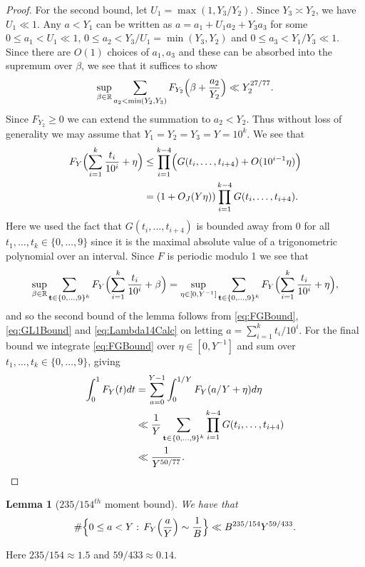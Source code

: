 \documentclass[10pt]{amsart}
\theoremstyle{plain}
\newtheorem{lmm}[thrm]{Lemma}
\numberwithin{sblmm}{thrm}
\numberwithin{equation}{section}
\begin{document}
\begin{proof}
For the second bound, let $U_1=\max(1,Y_3/Y_2)$. Since $Y_3\asymp Y_2$, we have $U_1\ll 1$. Any $a<Y_1$ can be written as $a=a_1+U_1a_2+Y_3 a_3$ for some $0\le a_1< U_1\ll 1$, $0\le a_2<Y_3/U_1=\min(Y_3,Y_2)$ and $0\le a_3< Y_1/Y_3\ll 1$. Since there are $O(1)$ choices of $a_1,a_3$ and these can be absorbed into the supremum over $\beta$, we see that it suffices to show
\[
\sup_{\beta\in\mathbb{R}}\sum_{a_2<\min(Y_2,Y_3)}F_{Y_2}\Bigl(\beta+\frac{a_2}{Y_2}\Bigr)\ll Y_2^{27/77}.
\]
Since $F_{Y_2}\ge 0$ we can extend the summation to $a_2<Y_2$. Thus without loss of generality we may assume that $Y_1=Y_2=Y_3=Y=10^k$. We see that
%
\begin{align}
F_Y\Bigl(\sum_{i=1}^{k}\frac{t_i}{10^i}+\eta\Bigr)
&\le\prod_{i=1}^{k-4}\Bigl( G(t_i,\dots,t_{i+4})+O(10^{i-1}\eta) \Bigr)\nonumber\\
&=(1+O_J(Y\eta))\prod_{i=1}^{k-4} G(t_i,\dots,t_{i+4}).\label{eq:FGBound}
\end{align}
%
Here we used the fact that $G(t_i,\dots,t_{i+4})$ is bounded away from 0  for all $t_1,\dots,t_{k}\in\{0,\dots,9\}$ since it is the maximal absolute value of a trigonometric polynomial over an interval. Since $F$ is periodic modulo 1 we see that
\[
\sup_{\beta\in\mathbb{R}}\sum_{\mathbf{t}\in\{0,\dots,9\}^k}F_Y\Bigl(\sum_{i=1}^{k}\frac{t_i}{10^i}+\beta\Bigr)=\sup_{\eta\in[0,Y^{-1}]}\sum_{\mathbf{t}\in\{0,\dots,9\}^k}F_Y\Bigl(\sum_{i=1}^{k}\frac{t_i}{10^i}+\eta\Bigr),
\]
and so the second bound of the lemma follows from \eqref{eq:FGBound}, \eqref{eq:GL1Bound} and \eqref{eq:Lambda14Calc} on letting $a=\sum_{i=1}^k t_i/10^i$. For the final bound we integrate \eqref{eq:FGBound} over $\eta\in[0,Y^{-1}]$ and sum over $t_1,\dots,t_k\in\{0,\dots,9\}$, giving
\begin{align*}
\int_0^1 F_Y(t)d t&=\sum_{a=0}^{Y-1}\int_0^{1/Y}F_Y(a/Y+\eta)d\eta\\
&\ll \frac{1}{Y}\sum_{\mathbf{t}\in\{0,\dots,9\}^k}\prod_{i=1}^{k-4} G(t_i,\dots,t_{i+4})\\
&\ll \frac{1}{Y^{50/77}}.\qedhere
\end{align*}
%
\end{proof}
%
%
%
%
\begin{lmm}[$235/154^{th}$ moment bound]\label{lmm:DigitDistribution}
%
We have that
\[
\#\Bigl\{0\le a<Y:\,F_Y\Bigl(\frac{a}{Y}\Bigr)\sim \frac{1}{B}\Bigr\}
\ll B^{235/154}Y^{59/433}.
\]
%
\end{lmm}
%
Here $235/154\approx 1.5$ and $59/433\approx 0.14$.
\end{document}
